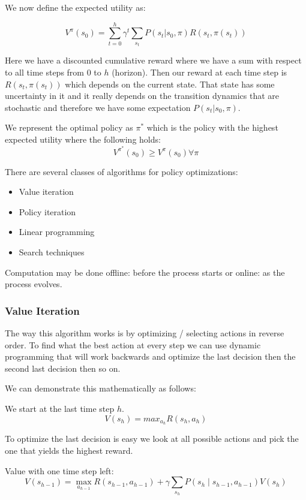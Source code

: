 \documentclass[12pt]{article}
\begin{document}
        We now define the expected utility as:
        
        $$ V^{\pi}(s_0) = \sum_{t=0}^h \gamma^t \sum_{s_t} P(s_t | s_0, \pi) R(s_t, \pi(s_t)) $$

        Here we have a discounted cumulative reward where we have a sum with respect to all time steps from 0 to $h$
        (horizon). Then our reward at each time step is $R(s_t, \pi (s_t))$ which depends on the current state. That
        state has some uncertainty in it and it really depends on the transition dynamics that are stochastic and
        therefore we have some expectation $P(s_t | s_0, \pi)$.

        We represent the optimal policy as $\pi^*$ which is the policy with the highest expected utility where the
        following holds:
        $$ V^{\pi^*} (s_0) \geq V^{\pi} (s_0) \forall \pi$$

        There are several classes of algorithms for policy optimizations:
        \begin{itemize}
            \item Value iteration
            \item Policy iteration
            \item Linear programming
            \item Search techniques
        \end{itemize}

        Computation may be done offline: before the process starts or online: as the process evolves. 
    
        \subsubsection{Value Iteration}
            The way this algorithm works is by optimizing / selecting actions in reverse order. To find what the best
            action at every step we can use dynamic programming that will work backwards and optimize the last decision
            then the second last decision then so on. 

            We can demonstrate this mathematically as follows:
            
            We start at the last time step $h$.
            $$ V(s_h) = max_{a_h} R(s_h, a_h) $$

            To optimize the last decision is easy we look at all possible actions and pick the one that yields the
            highest reward. 

            Value with one time step left:
            $$ V\left(s_{h-1}\right)=\max _{a_{h-1}} R\left(s_{h-1}, a_{h-1}\right)+\gamma \sum_{s_{h}}
            P(s_{h} \mid s_{h-1}, a_{h-1}) V\left(s_{h}\right) $$
\end{document}
